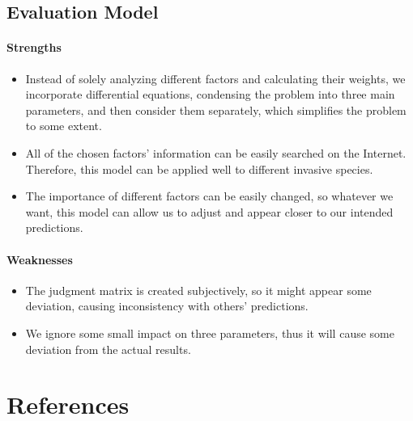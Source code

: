 \documentclass[12pt]{article}
\begin{document}
\subsection{Evaluation Model}
\paragraph{Strengths}
\begin{itemize}
\item Instead of solely analyzing different factors and calculating their weights, we incorporate differential equations, condensing the problem into three main parameters, and then consider them separately, which simplifies the problem to some extent.
\item All of the chosen factors' information can be easily searched on the Internet. Therefore, this model can be applied well to different invasive species.
\item The importance of different factors can be easily changed, so whatever we want, this model can allow us to adjust and appear closer to our intended predictions.
\end{itemize}

\paragraph{Weaknesses}
\begin{itemize}
\item The judgment matrix is created subjectively, so it might appear some deviation, causing inconsistency with others' predictions.
\item We ignore some small impact on three parameters, thus it will cause some deviation from the actual results.
\end{itemize}

\newpage

\section{References}

\printbibliography[heading=none]
\end{document}
